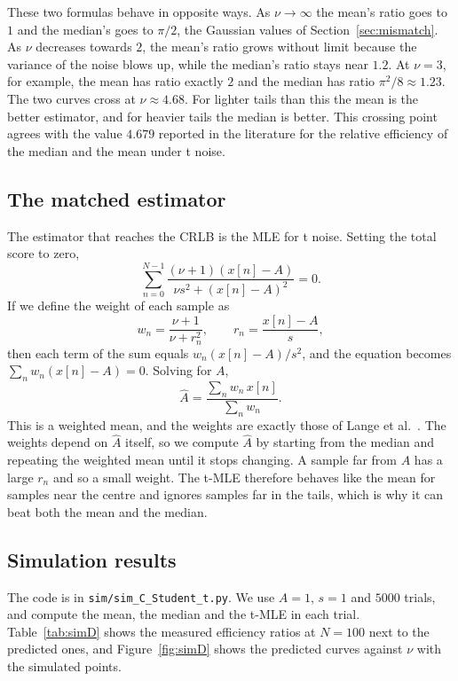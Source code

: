 \documentclass[11pt]{article}
\numberwithin{figure}{section}
\numberwithin{equation}{section}
\begin{document}
These two formulas behave in opposite ways. As $\nu \to \infty$ the mean's ratio goes to $1$ and
the median's goes to $\pi/2$, the Gaussian values of Section~\ref{sec:mismatch}. As $\nu$ decreases
towards $2$, the mean's ratio grows without limit because the variance of the noise blows up,
while the median's ratio stays near $1.2$. At $\nu = 3$, for example, the mean has ratio exactly $2$
and the median has ratio $\pi^2/8 \approx 1.23$. The two curves cross at $\nu \approx 4.68$. For
lighter tails than this the mean is the better estimator, and for heavier tails the median is
better. This crossing point agrees with the value $4.679$ reported in the literature for the
relative efficiency of the median and the mean under t noise.

\subsection{The matched estimator}

The estimator that reaches the CRLB is the MLE for t noise. Setting the total score to zero,
\[
  \sum_{n=0}^{N-1} \frac{(\nu + 1)(x[n] - A)}{\nu s^2 + (x[n] - A)^2} = 0 .
\]
If we define the weight of each sample as
\[
  w_n = \frac{\nu + 1}{\nu + r_n^2}, \qquad r_n = \frac{x[n] - A}{s},
\]
then each term of the sum equals $w_n (x[n] - A)/s^2$, and the equation becomes
$\sum_n w_n (x[n] - A) = 0$. Solving for $A$,
\[
  \hat A = \frac{\sum_n w_n\, x[n]}{\sum_n w_n}.
\]
This is a weighted mean, and the weights are exactly those of Lange et al.~\cite[eq.~(3)]{lange}.
The weights depend on $\hat A$ itself, so we compute $\hat A$ by starting from the median and
repeating the weighted mean until it stops changing. A sample far from $A$ has a large $r_n$ and so
a small weight. The t-MLE therefore behaves like the mean for samples near the centre and ignores
samples far in the tails, which is why it can beat both the mean and the median.

\subsection{Simulation results}

The code is in \texttt{sim/sim\_C\_Student\_t.py}. We use $A = 1$, $s = 1$ and $5000$ trials, and
compute the mean, the median and the t-MLE in each trial. Table~\ref{tab:simD} shows the measured
efficiency ratios at $N = 100$ next to the predicted ones, and Figure~\ref{fig:simD} shows the
predicted curves against $\nu$ with the simulated points.
\end{document}
